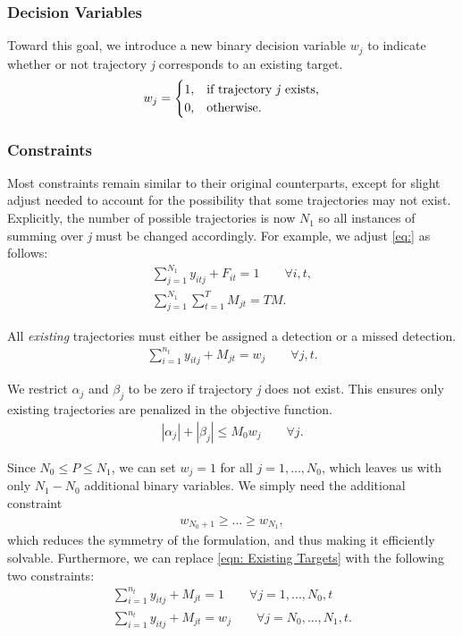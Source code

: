 \subsubsection{Decision Variables}
Toward this goal, we introduce a new binary decision variable $w_{j}$ to indicate whether or not trajectory \textit{j} corresponds to an existing target.
\[w_{j} = 
\begin{cases}
1, & \text{if trajectory \textit{j} exists,}\\
0, & \text{otherwise.}
\end{cases}\]

\subsubsection{Constraints}
Most constraints remain similar to their original counterparts, except for slight adjust needed to account for the possibility that some trajectories may not exist. Explicitly, the number of possible trajectories is now $N_{1}$ so all instances of summing over \textit{j} must be changed accordingly. For example, we adjust \eqref{eq:} as follows: 
\begin{align}
\sum_{j=1}^{N_{1}} y_{itj} + F_{it} = 1 \qquad \forall i,t,\\
\sum_{j=1}^{N_{1}} \sum_{t=1}^{T} M_{jt} = TM.
\end{align}

All \textit{existing} trajectories must either be assigned a detection or a missed detection. 
\begin{align}\label{eqn: Existing Targets}
\sum_{i=1}^{n_{t}} y_{itj} + M_{jt} = w_{j} \qquad \forall j,t.
\end{align}

We restrict $\alpha_{j}$ and $\beta_{j}$ to be zero if trajectory \textit{j} does not exist. This ensures only existing trajectories are penalized in the objective function. 
\begin{align}
|\alpha_{j}|+|\beta_{j}| \leq M_{0}w_{j}\qquad \forall j.
\end{align}

Since $N_{0} \leq P \leq N_{1}$, we can set $w_j=1$ for all $j=1,\ldots,N_0$, which leaves us with only $N_1-N_0$ additional binary variables. We simply need the additional constraint
\begin{align}
w_{N_0+1}\geq ...\geq w_{N_1},
\end{align}
which reduces the symmetry of the formulation, and thus making it efficiently solvable. Furthermore, we can replace \eqref{eqn: Existing Targets} with the following two constraints:
\begin{align}
	\sum_{i=1}^{n_{t}} y_{itj} + M_{jt} = 1 \qquad \forall j=1,...,N_{0},t\\
	\sum_{i=1}^{n_{t}} y_{itj} + M_{jt} = w_{j} \qquad \forall j=N_{0},...,N_{1},t.
\end{align}

